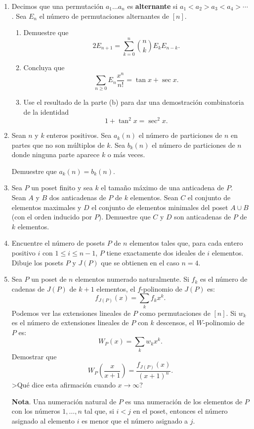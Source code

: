 \documentclass[letterpaper,10pt]{article}
\begin{document}
\begin{enumerate}

\item Decimos que una permutaci{\'o}n $a_1 \ldots a_n$ es {\bf
alternante} si $a_1 < a_2 > a_3 < a_4 > \cdots$. Sea $E_n$ el
n{\'u}mero de permutaciones alternantes de $[n]$.

\begin{enumerate}
\item Demuestre que
$$
2E_{n+1} = \sum_{k=0}^n {n \choose k} E_k E_{n-k}.
$$

\item Concluya que
$$
\sum_{n \geq 0} E_n \frac{x^n}{n!} = \tan x + \sec x.
$$

\item Use el resultado de la parte (b) para dar una
demostraci{\'o}n combinatoria de la identidad
$$
1 + \tan^2 x = \sec^2 x.
$$

\end{enumerate}

\item Sean $n$ y $k$ enteros positivos. Sea $a_k(n)$ el n{\'u}mero
de particiones de $n$ en partes que no son m{\'u}ltiplos de $k$.
Sea $b_k(n)$ el n{\'u}mero de particiones de $n$ donde ninguna
parte aparece $k$ o m{\'a}s veces.

Demuestre que $a_k(n) = b_k(n)$.

\item Sea $P$ un poset finito y sea $k$ el tama{\~n}o m{\'a}ximo
de una anticadena de $P$. Sean $A$ y $B$ dos anticadenas de $P$ de
$k$ elementos. Sean $C$ el conjunto de elementos maximales y $D$
el conjunto de elementos minimales del poset $A \cup B$ (con el
orden inducido por $P$). Demuestre que $C$ y $D$ son anticadenas
de $P$ de $k$ elementos.

\item Encuentre el n{\'u}mero de posets $P$ de $n$ elementos tales
que, para cada entero positivo $i$ con $1 \leq i \leq n-1$, $P$
tiene exactamente dos ideales de $i$ elementos. Dibuje los posets
$P$ y $J(P)$ que se obtienen en el caso $n = 4$.

\item

Sea $P$ un poset de $n$ elementos numerado naturalmente. Si $f_k$
es el n{\'u}mero de cadenas de $J(P)$ de $k+1$ elementos, el
$f$-polinomio de $J(P)$ es:
$$
f_{J(P)}(x) = \sum_k f_kx^k.
$$
Podemos ver las extensiones lineales de $P$ como permutaciones de
$[n]$. Si $w_k$ es el n{\'u}mero de extensiones lineales de $P$
con $k$ descensos, el $W$-polinomio de $P$ es:
$$
W_P(x) = \sum_k w_kx^k.
$$
Demostrar que
$$
W_P\left(\frac{x}{x+1}\right) = \frac{f_{J(P)}(x)}{(x+1)^n}.
$$
>Qu{\'e} dice esta afirmaci{\'o}n cuando $x \rightarrow \infty$?



{\bf Nota}. Una numeraci{\'o}n natural de $P$ es una
numeraci{\'o}n de los elementos de $P$ con los n{\'u}meros $1,
\ldots, n$ tal que, si $i < j$ en el poset, entonces el n{\'u}mero
asignado al elemento $i$ es menor que el n{\'u}mero asignado a
$j$.



\end{enumerate}


\end{document}
